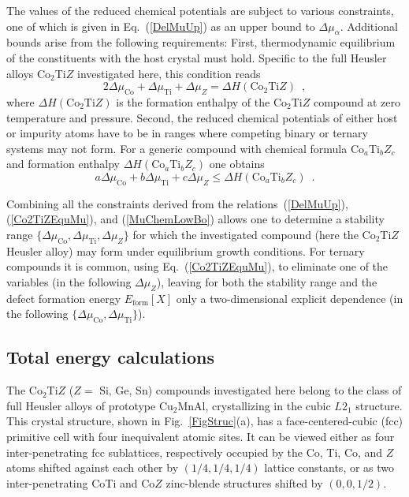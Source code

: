 \documentclass[aps,prb,twocolumn,superscriptaddress,showpacs]{revtex4}
\newcommand{\FG}[1]{Fig.~\ref{#1}}
\newcommand{\EQ}[1]{Eq.~(\ref{#1})}
\begin{document}
The values of the reduced chemical potentials 
are subject to various constraints,
one of which is given in \EQ{DelMuUp} as
an upper bound to $\Delta\mu_{\alpha}$. Additional
bounds arise from the following requirements:
First, thermodynamic equilibrium of the constituents 
with the host crystal must hold. Specific to the 
full Heusler alloys Co$_2$Ti$Z$ investigated here, 
this condition reads 
\begin{equation}
  \label{Co2TiZEquMu}
  2\Delta\mu_\text{Co} + \Delta\mu_\text{Ti} + \Delta\mu_Z = 
            \Delta H(\text{Co}_2\text{Ti}Z) \enspace,
\end{equation}
where $\Delta H(\text{Co}_2\text{Ti}Z)$ is the formation enthalpy of
the Co$_2$Ti$Z$ compound at zero temperature and pressure.
Second, the reduced chemical 
potentials of either host or impurity atoms
have to be in ranges where competing binary or ternary
systems may not form. For a generic compound
with chemical formula Co$_a$Ti$_bZ_c$ and
formation enthalpy $\Delta H(\text{Co}_a\text{Ti}_bZ_c)$
one obtains
\begin{equation}
  \label{MuChemLowBo}
  a\Delta\mu_\text{Co} +   b\Delta\mu_\text{Ti} + c\Delta\mu_Z 
         \leq \Delta H(\text{Co}_a\text{Ti}_bZ_c)\enspace.
\end{equation}

Combining all the constraints derived from the
relations~(\ref{DelMuUp}), (\ref{Co2TiZEquMu}), and 
(\ref{MuChemLowBo}) allows one to determine a stability
range $\{\Delta\mu_\text{Co},\Delta\mu_\text{Ti},\Delta\mu_Z\}$
for which the investigated compound (here the Co$_2$Ti$Z$ Heusler
alloy) may form under equilibrium growth conditions. 
For ternary compounds it is common, using \EQ{Co2TiZEquMu},
to eliminate one of the variables 
(in the following $\Delta\mu_Z$), leaving for
both the stability range and the defect formation
energy $E_\text{form}[X]$ only a two-dimensional 
explicit dependence (in the following 
$\{\Delta\mu_\text{Co},\Delta\mu_\text{Ti}\}$). 

\subsection{Total energy calculations}

The Co$_2$Ti$Z$ ($Z=$ Si, Ge, Sn) compounds investigated here
belong to the class of full Heusler alloys\cite{GFP11} 
of prototype Cu$_2$MnAl, crystallizing in the cubic $L2_1$ 
structure. This crystal structure, shown in \FG{FigStruc}(a), 
has a face-centered-cubic (fcc) primitive cell with four 
inequivalent atomic sites. It can be viewed 
either as four inter-penetrating fcc sublattices, respectively 
occupied by the Co, Ti, Co, and $Z$ atoms
shifted against each other by $(1/4,1/4,1/4)$
lattice constants, or as two inter-penetrating CoTi and 
Co$Z$ zinc-blende structures shifted by $(0,0,1/2)$.
\end{document}
